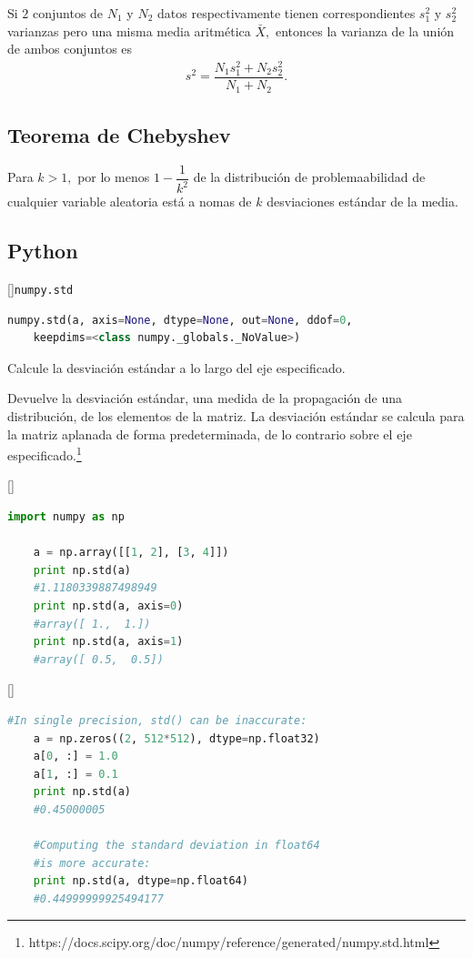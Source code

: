 Si $2$ conjuntos de $N_{1}$ y $N_{2}$ datos respectivamente tienen correspondientes $s_{1}^{2}$ y $s_{2}^{2}$ varianzas pero una misma media aritmética $\bar{X},$ entonces la varianza de la unión de ambos conjuntos es
\begin{align}
	s^{2}=\dfrac{N_{1}s_{1}^{2}+N_{2}s_{2}^{2}}{N_{1}+N_{2}}.
\end{align}

\subsection{Teorema de Chebyshev}
Para $k>1,$ por lo menos $1-\dfrac{1}{k^{2}}$ de la distribución de problemaabilidad de cualquier variable aleatoria está a nomas  de $k$ desviaciones estándar de la media.

\subsection{Python}
[]{\texttt{numpy.std}}
\begin{lstlisting}[language=Python]
	numpy.std(a, axis=None, dtype=None, out=None, ddof=0,
	keepdims=<class numpy._globals._NoValue>)
\end{lstlisting}

Calcule la desviación estándar a lo largo del eje especificado.

Devuelve la desviación estándar, una medida de la propagación de una distribución, de los elementos de la matriz. La desviación estándar se calcula para la matriz aplanada de forma predeterminada, de lo contrario sobre el eje especificado.\footnote{https://docs.scipy.org/doc/numpy/reference/generated/numpy.std.html}

[]
\begin{lstlisting}[language=Python]
	import numpy as np
	
	a = np.array([[1, 2], [3, 4]])
	print np.std(a)
	#1.1180339887498949
	print np.std(a, axis=0)
	#array([ 1.,  1.])
	print np.std(a, axis=1)
	#array([ 0.5,  0.5])
\end{lstlisting}


[]
\begin{lstlisting}[language=Python]
	#In single precision, std() can be inaccurate:
	a = np.zeros((2, 512*512), dtype=np.float32)
	a[0, :] = 1.0
	a[1, :] = 0.1
	print np.std(a)
	#0.45000005
	
	#Computing the standard deviation in float64
	#is more accurate:
	print np.std(a, dtype=np.float64)
	#0.44999999925494177
\end{lstlisting}





